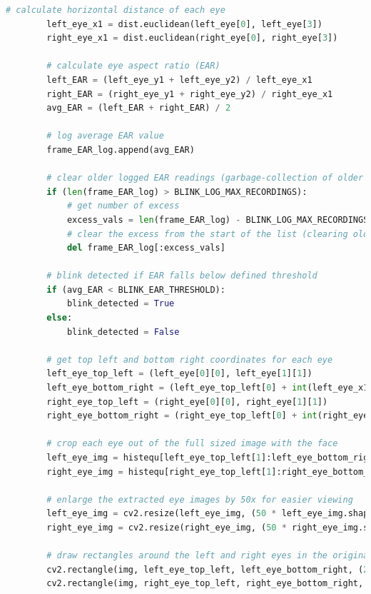 \documentclass[10pt,conference]{IEEEtran}
\begin{document}
\begin{lstlisting}[language=Python,basicstyle=\tiny, showspaces=false, showstringspaces=false tabsize=1, breaklines=true]
        # calculate horizontal distance of each eye
        left_eye_x1 = dist.euclidean(left_eye[0], left_eye[3])
        right_eye_x1 = dist.euclidean(right_eye[0], right_eye[3])

        # calculate eye aspect ratio (EAR)
        left_EAR = (left_eye_y1 + left_eye_y2) / left_eye_x1
        right_EAR = (right_eye_y1 + right_eye_y2) / right_eye_x1
        avg_EAR = (left_EAR + right_EAR) / 2
        
        # log average EAR value
        frame_EAR_log.append(avg_EAR)

        # clear older logged EAR readings (garbage-collection of older recordings)
        if (len(frame_EAR_log) > BLINK_LOG_MAX_RECORDINGS):
            # get number of excess
            excess_vals = len(frame_EAR_log) - BLINK_LOG_MAX_RECORDINGS
            # clear the excess from the start of the list (clearing older excess values)
            del frame_EAR_log[:excess_vals]

        # blink detected if EAR falls below defined threshold
        if (avg_EAR < BLINK_EAR_THRESHOLD):
            blink_detected = True
        else:
            blink_detected = False

        # get top left and bottom right coordinates for each eye
        left_eye_top_left = (left_eye[0][0], left_eye[1][1])
        left_eye_bottom_right = (left_eye_top_left[0] + int(left_eye_x1), left_eye_top_left[1] + int(left_eye_y1))
        right_eye_top_left = (right_eye[0][0], right_eye[1][1])
        right_eye_bottom_right = (right_eye_top_left[0] + int(right_eye_x1), right_eye_top_left[1] + int(right_eye_y1))

        # crop each eye out of the full sized image with the face
        left_eye_img = histequ[left_eye_top_left[1]:left_eye_bottom_right[1], left_eye_top_left[0]:left_eye_bottom_right[0]]
        right_eye_img = histequ[right_eye_top_left[1]:right_eye_bottom_right[1], right_eye_top_left[0]:right_eye_bottom_right[0]]

        # enlarge the extracted eye images by 50x for easier viewing
        left_eye_img = cv2.resize(left_eye_img, (50 * left_eye_img.shape[1], 50 * left_eye_img.shape[0]))
        right_eye_img = cv2.resize(right_eye_img, (50 * right_eye_img.shape[1], 50 * right_eye_img.shape[0]))

        # draw rectangles around the left and right eyes in the original feed frame
        cv2.rectangle(img, left_eye_top_left, left_eye_bottom_right, (255, 0, 0), 1)
        cv2.rectangle(img, right_eye_top_left, right_eye_bottom_right, (0, 255, 0), 1)


\end{lstlisting}
\end{document}
